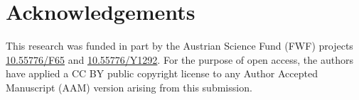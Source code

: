 \documentclass[11pt,reqno]{amsart}
\theoremstyle{plain}
\theoremstyle{definition}
\theoremstyle{remark}
\numberwithin{equation}{section}
\newcommand{\1}{\mathbbm{1}} %
\begin{document}
\section*{Acknowledgements}

This research was funded in part by the Austrian Science Fund (FWF) projects \href{https://doi.org/10.55776/F65}{10.55776/F65} and \href{https://doi.org/10.55776/Y1292}{10.55776/Y1292}. For the purpose of open access, the authors have applied a CC BY public copyright license to any Author Accepted Manuscript (AAM) version arising from this submission.


\printbibliography
\end{document}

